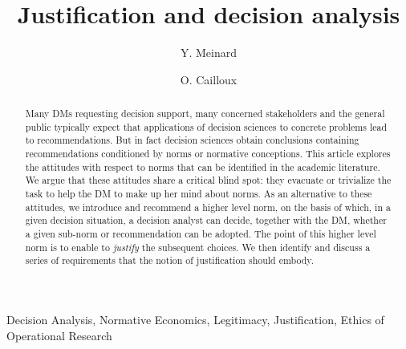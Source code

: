 \documentclass[preprint, french, english, 11pt, authoryear]{elsarticle}%
\begin{document}
\hypersetup{citecolor=black}
\title{Justification and decision analysis}

\author[ld]{Y. Meinard}
\author[ld]{O. Cailloux}
\address[ld]{Universit\'e Paris-Dauphine, PSL Research University, CNRS, UMR [7243], LAMSADE, 75016 PARIS, FRANCE}

\begin{abstract}
Many \acp{DM} requesting decision support, many concerned stakeholders and the general public typically expect that applications of decision sciences to concrete problems lead to recommendations. But in fact decision sciences obtain conclusions containing recommendations conditioned by norms or normative conceptions. This article explores the attitudes with respect to norms that can be identified in the academic literature. We argue that these attitudes share a critical blind spot: they evacuate or trivialize the task to help the \ac{DM} to make up her mind about norms. As an alternative to these attitudes, we introduce and recommend a higher level norm, on the basis of which, in a given decision situation, a decision analyst can decide, together with the \ac{DM}, whether a given sub-norm or recommendation can be adopted. The point of this higher level norm is to enable to \emph{justify} the subsequent choices. We then identify and discuss a series of requirements that the notion of justification should embody.
\end{abstract}
\acresetall
\begin{keyword}
Decision Analysis, Normative Economics, Legitimacy, Justification, Ethics of Operational Research
\end{keyword}

\maketitle
\end{document}
